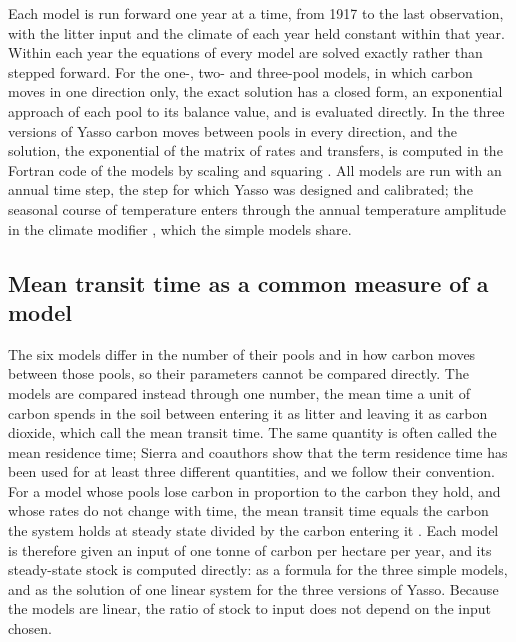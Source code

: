 \documentclass[11pt]{article}
\begin{document}
Each model is run forward one year at a time, from 1917 to the last observation, with the
litter input and the climate of each year held constant within that year. Within each year the
equations of every model are solved exactly rather than stepped forward. 
 For the
one-, two- and three-pool models, in which carbon moves in one direction only, the exact solution has a closed form, an exponential approach of each pool to its balance value, and is evaluated directly. 
In the three versions of Yasso carbon moves between pools
in every direction, and the solution, the exponential of the matrix of rates and transfers, is
computed in the Fortran code of the models by scaling and squaring \citep{MolerVanLoan2003}. 
All models are run with an annual time step, the step for which Yasso was designed and calibrated; the seasonal course of temperature enters through the annual temperature amplitude in the climate modifier \citep{Tuomi2009}, which the simple models share.


\subsection{Mean transit time as a common measure of a model}\label{sec:mtt}

The six models differ in the number of their pools and in how carbon moves between those pools,
so their parameters cannot be compared directly. The models are compared instead through one
number, the mean time a unit of carbon spends in the soil between entering it as litter and
leaving it as carbon dioxide, which \citet{Sierra2017} call the mean transit time. The same
quantity is often called the mean residence time; Sierra and coauthors show that the term
residence time has been used for at least three different quantities, and we follow their
convention. For a model whose pools lose carbon in proportion to the carbon they hold, and whose
rates do not change with time, the mean transit time equals the carbon the system holds at steady
state divided by the carbon entering it \citep{Rasmussen2016,Sierra2017}. Each model is therefore
given an input of one tonne of carbon per hectare per year, and its steady-state stock is computed
directly: as a formula for the three simple models, and as the solution of one linear system for
the three versions of Yasso. Because the models are linear, the ratio of stock to input does not
depend on the input chosen.
\end{document}
